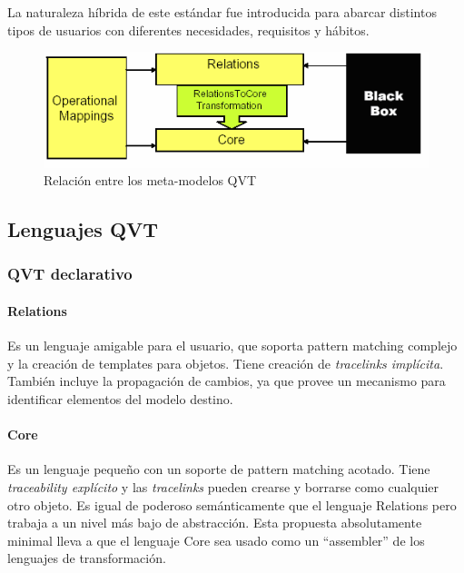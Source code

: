 \documentclass[a4paper,12pt,twoside,spanish,openright]{book}
\begin{document}
La naturaleza híbrida de este estándar fue introducida para abarcar distintos tipos de usuarios con diferentes necesidades, requisitos y hábitos.

\bigskip

\begin{figure}[hbtp]
\centering
\includegraphics[scale=.65]{./img/metamodelosQVT}
\caption{Relación entre los meta-modelos QVT}
\label{fig:QVTmetamodelos}
\end{figure}


\subsection{Lenguajes QVT}


\subsubsection{QVT declarativo}


\paragraph{Relations}

Es un lenguaje amigable para el usuario, que soporta \textsf{pattern matching} complejo y la creación de templates para objetos. Tiene creación de \textit{tracelinks implícita}. También incluye la propagación de cambios, ya que provee un mecanismo para identificar elementos del modelo destino. 

\paragraph{Core}

Es un lenguaje pequeño con un soporte de \textsf{pattern matching} acotado. Tiene \textit{traceability explícito} y las \textit{tracelinks} pueden crearse y borrarse como cualquier otro objeto. Es igual de poderoso semánticamente que el lenguaje \textsf{Relations} pero trabaja a un nivel más bajo de abstracción. Esta propuesta absolutamente minimal lleva a que el lenguaje \textsf{Core} sea usado como un \textsf{“assembler”} de los lenguajes de transformación.
\end{document}
